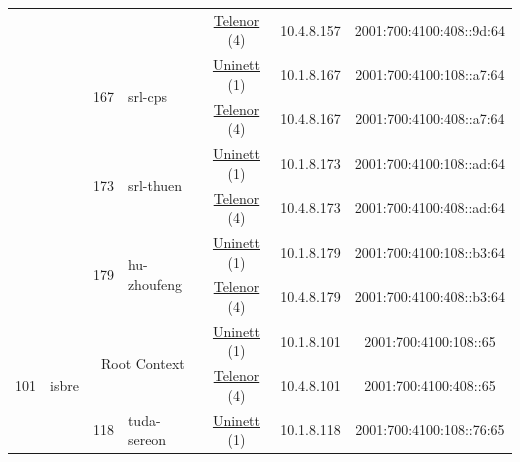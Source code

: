 \begin{small}
\begin{center}
\begin{longtable}{|c|c|c|c|c|c|c|c|}
  &  &  &  & \multicolumn{2}{|c|}{\tiny{\href{https://www.telenor.no}{Telenor} (4)}} & \tiny{10.4.8.157} & \tiny{2001:700:4100:408::9d:64} \\* \cline{3-3}\cline{4-4}\cline{5-5}\cline{6-6}\cline{7-7}\cline{8-8}
  &  & \multirow{2}{*}{\tiny{167}} & \multicolumn{1}{|l|}{\multirow{2}{*}{\tiny{srl-cps}}} & \multicolumn{2}{|c|}{\tiny{\href{https://www.uninett.no}{Uninett} (1)}} & \tiny{10.1.8.167} & \tiny{2001:700:4100:108::a7:64} \\* \cline{5-5}\cline{6-6}\cline{7-7}\cline{8-8}
  &  &  &  & \multicolumn{2}{|c|}{\tiny{\href{https://www.telenor.no}{Telenor} (4)}} & \tiny{10.4.8.167} & \tiny{2001:700:4100:408::a7:64} \\* \cline{3-3}\cline{4-4}\cline{5-5}\cline{6-6}\cline{7-7}\cline{8-8}
  &  & \multirow{2}{*}{\tiny{173}} & \multicolumn{1}{|l|}{\multirow{2}{*}{\tiny{srl-thuen}}} & \multicolumn{2}{|c|}{\tiny{\href{https://www.uninett.no}{Uninett} (1)}} & \tiny{10.1.8.173} & \tiny{2001:700:4100:108::ad:64} \\* \cline{5-5}\cline{6-6}\cline{7-7}\cline{8-8}
  &  &  &  & \multicolumn{2}{|c|}{\tiny{\href{https://www.telenor.no}{Telenor} (4)}} & \tiny{10.4.8.173} & \tiny{2001:700:4100:408::ad:64} \\* \cline{3-3}\cline{4-4}\cline{5-5}\cline{6-6}\cline{7-7}\cline{8-8}
  &  & \multirow{2}{*}{\tiny{179}} & \multicolumn{1}{|l|}{\multirow{2}{*}{\tiny{hu-zhoufeng}}} & \multicolumn{2}{|c|}{\tiny{\href{https://www.uninett.no}{Uninett} (1)}} & \tiny{10.1.8.179} & \tiny{2001:700:4100:108::b3:64} \\* \cline{5-5}\cline{6-6}\cline{7-7}\cline{8-8}
  &  &  &  & \multicolumn{2}{|c|}{\tiny{\href{https://www.telenor.no}{Telenor} (4)}} & \tiny{10.4.8.179} & \tiny{2001:700:4100:408::b3:64} \\ \hline
 \multirow{34}{*}{\tiny{101}} & \multicolumn{1}{|l|}{\multirow{34}{*}{\tiny{isbre}}} & \multicolumn{2}{|c|}{\multirow{2}{*}{\tiny{Root Context}}} & \multicolumn{2}{|c|}{\tiny{\href{https://www.uninett.no}{Uninett} (1)}} & \tiny{10.1.8.101} & \tiny{2001:700:4100:108::65} \\* \cline{5-5}\cline{6-6}\cline{7-7}\cline{8-8}
  &  & \multicolumn{2}{|c|}{} & \multicolumn{2}{|c|}{\tiny{\href{https://www.telenor.no}{Telenor} (4)}} & \tiny{10.4.8.101} & \tiny{2001:700:4100:408::65} \\* \cline{3-3}\cline{4-4}\cline{5-5}\cline{6-6}\cline{7-7}\cline{8-8}
  &  & \multirow{2}{*}{\tiny{118}} & \multicolumn{1}{|l|}{\multirow{2}{*}{\tiny{tuda-sereon}}} & \multicolumn{2}{|c|}{\tiny{\href{https://www.uninett.no}{Uninett} (1)}} & \tiny{10.1.8.118} & \tiny{2001:700:4100:108::76:65} \\* \cline{5-5}\cline{6-6}\cline{7-7}\cline{8-8}

\end{longtable}
\end{center}
\end{small}
